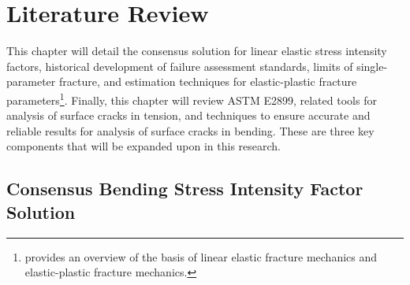 \chapter{Literature Review}
\label{chap:literature-review}

This chapter will detail the consensus solution for linear elastic stress intensity factors, historical development of failure assessment standards, limits of single-parameter fracture, and estimation techniques for elastic-plastic fracture parameters\footnote{ provides an overview of the basis of linear elastic fracture mechanics and elastic-plastic fracture mechanics.}.
Finally, this chapter will review ASTM E2899, related tools for analysis of surface cracks in tension, and techniques to ensure accurate and reliable results for analysis of surface cracks in bending.
These are three key components that will be expanded upon in this research.

\section{Consensus Bending Stress Intensity Factor Solution}

